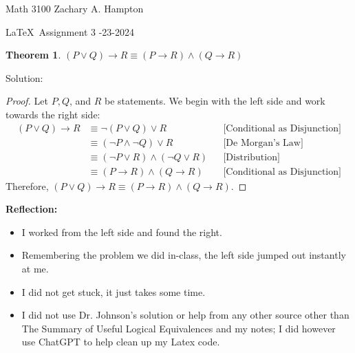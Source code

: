 \documentclass[12pt]{article}
\newtheorem*{theorem}{Theorem}
\theoremstyle{definition}
\newcommand{\solution}{\textcolor{PineGreen}{Solution:\newline}}
\begin{document}
Math 3100 \hfill Zachary A. Hampton

\LaTeX~Assignment 3 \hfill 
{}-23-2024

\bigskip

\begin{theorem}
    $(P \lor Q) \rightarrow R \equiv (P \rightarrow R) \land (Q \rightarrow R)$
\end{theorem}
    
\solution 
\begin{proof}
    Let $P, Q$, and $R$ be statements. We begin with the left side and work towards the right side:
    \begin{align*}
        (P \lor Q) \rightarrow R &\equiv \neg (P \lor Q) \lor R  && \text{[Conditional as Disjunction]} \\
        &\equiv (\neg P \land \neg Q) \lor R  && \text{[De Morgan's Law]} \\
        &\equiv (\neg P \lor R) \land (\neg Q \lor R)  && \text{[Distribution]} \\
        &\equiv (P \rightarrow R) \land (Q \rightarrow R)  && \text{[Conditional as Disjunction]}            
    \end{align*}
    Therefore, $(P \lor Q) \rightarrow R \equiv (P \rightarrow R) \land (Q \rightarrow R)$.
\end{proof}

\textbf{Reflection:}
    \begin{itemize}
        \item I worked from the left side and found the right.
        \item Remembering the problem we did in-class, the left side jumped out instantly at me.
        \item I did not get stuck, it just takes some time.
        \item I did not use Dr. Johnson's solution or help from any other source other than The Summary of Useful Logical Equivalences and my notes; I did however use ChatGPT to help clean up my Latex code.
    \end{itemize}
\end{document}
